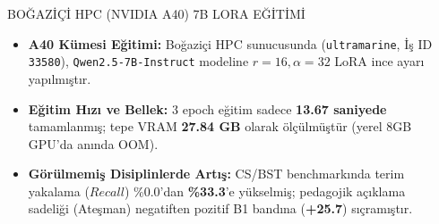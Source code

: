 \documentclass[final]{beamer}
\newlength{\sepwidth}
\newlength{\colwidth}
\newcommand{\separatorcolumn}{\begin{column}{\sepwidth}\end{column}}
\begin{document}
\begin{frame}[t]
\begin{columns}[t,totalwidth=0.98\paperwidth]

\separatorcolumn

\begin{column}{\colwidth}

  \begin{block}{BOĞAZİÇİ HPC (NVIDIA A40) 7B LORA EĞİTİMİ}
    \begin{itemize}
      \item \textbf{A40 Kümesi Eğitimi:} Boğaziçi HPC sunucusunda (\texttt{ultramarine}, İş ID \texttt{33580}), \texttt{Qwen2.5-7B-Instruct} modeline $r=16, \alpha=32$ LoRA ince ayarı yapılmıştır.
      \item \textbf{Eğitim Hızı ve Bellek:} 3 epoch eğitim sadece \textbf{13.67 saniyede} tamamlanmış; tepe VRAM \textbf{27.84 GB} olarak ölçülmüştür (yerel 8GB GPU'da anında OOM).
      \item \textbf{Görülmemiş Disiplinlerde Artış:} CS/BST benchmarkında terim yakalama ($Recall$) \%0.0'dan \textbf{\%33.3}'e yükselmiş; pedagojik açıklama sadeliği (Ateşman) negatiften pozitif B1 bandına (\textbf{+25.7}) sıçramıştır.
    \end{itemize}


\end{block}
\end{column}
\end{columns}
\end{frame}
\end{document}
